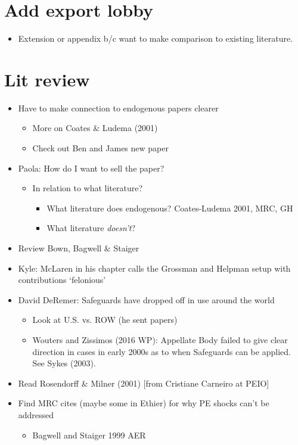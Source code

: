\documentclass[12pt]{article}
\begin{document}
\section{Add export lobby}
		\begin{itemize}
			\item Extension or appendix b/c want to make comparison to existing literature.
		\end{itemize}

\section{Lit review}
\begin{itemize}
	\item Have to make connection to endogenous papers clearer
		\begin{itemize}
			\item More on Coates $\&$ Ludema (2001)
			\item Check out Ben and James new paper
		\end{itemize}
	\item Paola: How do I want to sell the paper?
		\begin{itemize}
			\item In relation to what literature?
				\begin{itemize}
					\item What literature does endogenous? Coates-Ludema 2001, MRC, GH
					\item What literature \textit{doesn't}?
				\end{itemize}
			\end{itemize}
	\item Review Bown, Bagwell $\&$ Staiger
	\item Kyle: McLaren in his chapter calls the Grossman and Helpman setup with contributions `felonious'
	\item David DeRemer: Safeguards have dropped off in use around the world
		\begin{itemize}
			\item Look at U.S. vs. ROW (he sent papers)
			\item Wouters and Zissimos (2016 WP): Appellate Body failed to give clear direction in cases in early 2000s as to when Safeguards can be applied. See Sykes (2003).
		\end{itemize}
	\item Read Rosendorff $\&$ Milner (2001) [from Cristiane Carneiro at PEIO]
	\item Find MRC cites (maybe some in Ethier) for why PE shocks can't be addressed
		\begin{itemize}
			\item Bagwell and Staiger 1999 AER
		\end{itemize}
\end{itemize}
\end{document}
